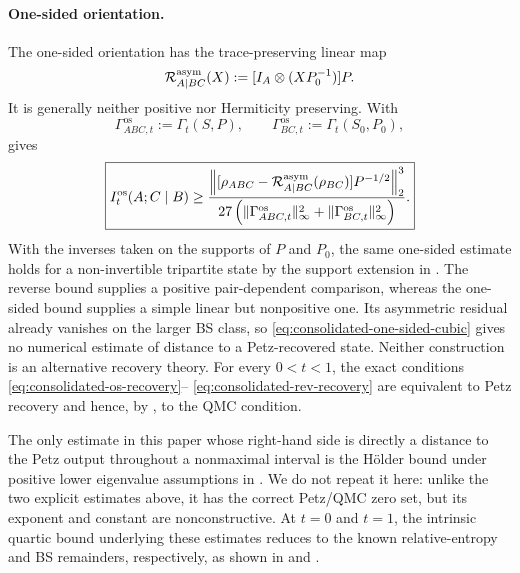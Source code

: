 \documentclass[11pt]{article}
\theoremstyle{remark}
\DeclareMathOperator{\os}{os}
\newcommand{\1}{\mathbbm{1}}
\begin{document}
\paragraph{One-sided orientation.}
The one-sided orientation has the trace-preserving linear map
\begin{equation}
 \mathcal R_{A\mid BC}^{\rm asym}(X)
 :=[I_A\otimes(XP_0^{-1})]P.
 \label{eq:consolidated-tripartite-asymmetric-map}
\end{equation}
It is generally neither positive nor Hermiticity preserving.  With
\begin{equation}
 \Gamma_{ABC,t}^{\os}:=\Gamma_t(S,P),\qquad
 \Gamma_{BC,t}^{\os}:=\Gamma_t(S_0,P_0),
\end{equation}
 gives
\begin{equation}
 \boxed{
 I_t^{\os}(A;C\mid B)
 \geq
 \frac{\left\lVert
 [\rho_{ABC}
 -\mathcal R_{A\mid BC}^{\rm asym}(\rho_{BC})]
 P^{-1/2}\right\rVert_2^3}
 {27\left(
 \lVert\Gamma_{ABC,t}^{\os}\rVert_\infty^2+
 \lVert\Gamma_{BC,t}^{\os}\rVert_\infty^2\right)}.}
 \label{eq:consolidated-one-sided-cubic}
\end{equation}
With the inverses taken on the supports of $P$ and $P_0$, the same
one-sided estimate holds for a non-invertible tripartite state by the
support extension in
.
The reverse bound supplies a positive pair-dependent comparison,
whereas the one-sided bound supplies a simple linear but nonpositive
one.  Its asymmetric residual already vanishes on the larger BS
class, so \eqref{eq:consolidated-one-sided-cubic} gives no numerical
estimate of distance to a Petz-recovered state.  Neither construction
is an alternative recovery theory.  For every $0<t<1$, the exact
conditions \eqref{eq:consolidated-os-recovery}--%
\eqref{eq:consolidated-rev-recovery} are equivalent to Petz recovery
and hence, by , to the QMC
condition.

The only estimate in this paper whose right-hand side is directly a
distance to the Petz output throughout a nonmaximal interval
is the H\"older bound under positive lower eigenvalue assumptions in
.  We do not repeat it
here: unlike the two explicit estimates above, it has the correct
Petz/QMC zero set, but its exponent and constant are nonconstructive.
At $t=0$ and $t=1$, the intrinsic quartic bound underlying these
estimates reduces to the known relative-entropy and BS remainders,
respectively, as shown in \cite[Corollary~5.1]{carlen2018recovery} and
\cite[Theorems~5.3 and~7.1]{bluhm2020strengthened}.
\end{document}
